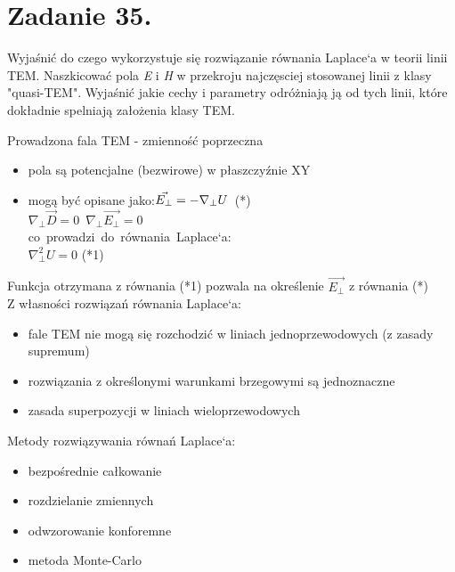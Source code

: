 \section*{Zadanie 35.}
\begin{task}
	Wyjaśnić do czego wykorzystuje się rozwiązanie równania Laplace`a w teorii linii TEM. Naszkicować pola
	\textsl{E} i \textsl{H} w przekroju najczęsciej stosowanej linii z klasy "quasi-TEM". Wyjaśnić jakie cechy
	i parametry odróżniają ją od tych linii, które dokładnie spelniają założenia klasy TEM.\\
\end{task}

\begin{solution}
	Prowadzona fala TEM - zmienność poprzeczna
	\begin{itemize}
	\item pola są potencjalne (bezwirowe) w płaszczyźnie XY
	\item mogą być opisane jako:$\\\vec{E_{\perp}} = -\nabla_{\perp}U$\ (*)\\
		$\nabla_{\perp}\vec{D}=0$\     $\nabla_{\perp}\vec{E_{\perp}}=0$\\
		co\ prowadzi\ do\ równania\ Laplace`a:\\
		$\nabla_{\perp}^2U=0$    (*1)
	\end{itemize}
	Funkcja otrzymana z równania (*1) pozwala na określenie ${\vec{E_{\perp}}}$ z równania (*)\\
	Z własności rozwiązań równania Laplace`a:
	\begin{itemize}
	\item fale TEM nie mogą się rozchodzić w liniach jednoprzewodowych (z zasady supremum)
	\item rozwiązania z określonymi warunkami brzegowymi są jednoznaczne
	\item zasada superpozycji w liniach wieloprzewodowych\\			
	\end{itemize}
	Metody rozwiązywania równań Laplace`a:
	\begin{itemize}
	\item bezpośrednie całkowanie
	\item rozdzielanie zmiennych
	\item odwzorowanie konforemne
	\item metoda Monte-Carlo	
	\end{itemize}


\end{solution}
